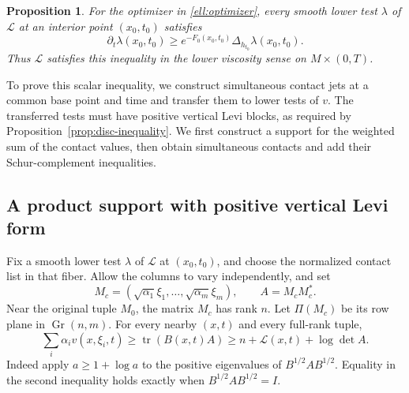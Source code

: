 \documentclass[11pt]{article}
\newtheorem{proposition}[theorem]{Proposition}
\theoremstyle{definition}
\theoremstyle{remark}
\DeclareMathOperator{\tr}{tr}
\DeclareMathOperator{\Gr}{Gr}
\numberwithin{equation}{section}
\begin{document}
\begin{proposition}\label{prop:ellipsoid-comparison}
For the optimizer in \eqref{ell:optimizer}, every smooth lower test
$\lambda$ of $\mathcal L$ at an interior point $(x_0,t_0)$ satisfies
\begin{equation}\label{ell:volume-viscosity}
 \partial_t\lambda(x_0,t_0)
 \ge e^{-F_0(x_0,t_0)}\Delta_{h_{t_0}}\lambda(x_0,t_0).
\end{equation}
Thus $\mathcal L$ satisfies this inequality in the lower viscosity
sense on $M\times(0,T)$.
\end{proposition}

To prove this scalar inequality, we construct simultaneous contact
jets at a common base point and time and transfer them to lower tests
of $v$.  The transferred tests must have positive vertical Levi blocks,
as required by
Proposition~\ref{prop:disc-inequality}.  We first construct a support
for the weighted sum of the contact values, then obtain simultaneous
contacts and add their Schur-complement inequalities.

\subsection{A product support with positive vertical Levi form}

Fix a smooth lower test $\lambda$ of $\mathcal L$ at $(x_0,t_0)$,
and choose the normalized contact list in that fiber.  Allow the
columns to vary independently, and set
\begin{equation}\label{ell:rectangular-matrix}
 M_c=(\sqrt{\alpha_1}\xi_1,\ldots,\sqrt{\alpha_m}\xi_m),
 \qquad A=M_cM_c^*.
\end{equation}
Near the original tuple $M_0$, the matrix $M_c$ has rank $n$.
Let $\Pi(M_c)$ be its row plane in $\Gr(n,m)$.
For every nearby $(x,t)$ and every full-rank tuple,
\begin{equation}\label{ell:product-support}
 \sum_i\alpha_i v(x,\xi_i,t)
 \ge\tr(B(x,t)A)
 \ge n+\mathcal L(x,t)+\log\det A.
\end{equation}
Indeed apply $a\ge1+\log a$ to the positive eigenvalues of
$B^{1/2}AB^{1/2}$.  Equality in the second inequality holds exactly
when $B^{1/2}AB^{1/2}=I$.
\end{document}
